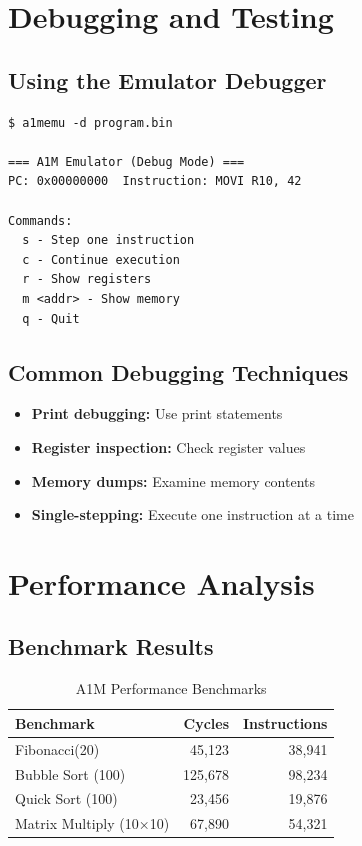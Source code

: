 \documentclass[12pt,a4paper,oneside]{book}
\begin{document}
\chapter{Debugging and Testing}

\section{Using the Emulator Debugger}

\begin{verbatim}
$ a1memu -d program.bin

=== A1M Emulator (Debug Mode) ===
PC: 0x00000000  Instruction: MOVI R10, 42

Commands:
  s - Step one instruction
  c - Continue execution
  r - Show registers
  m <addr> - Show memory
  q - Quit
\end{verbatim}

\section{Common Debugging Techniques}

\begin{itemize}
    \item \textbf{Print debugging:} Use print statements
    \item \textbf{Register inspection:} Check register values
    \item \textbf{Memory dumps:} Examine memory contents
    \item \textbf{Single-stepping:} Execute one instruction at a time
\end{itemize}

\chapter{Performance Analysis}

\section{Benchmark Results}

\begin{table}[H]
\centering
\caption{A1M Performance Benchmarks}
\begin{tabular}{|l|r|r|}
\hline
\textbf{Benchmark} & \textbf{Cycles} & \textbf{Instructions} \\
\hline
Fibonacci(20) & 45,123 & 38,941 \\
Bubble Sort (100) & 125,678 & 98,234 \\
Quick Sort (100) & 23,456 & 19,876 \\
Matrix Multiply (10×10) & 67,890 & 54,321 \\
\hline
\end{tabular}
\end{table}
\end{document}
